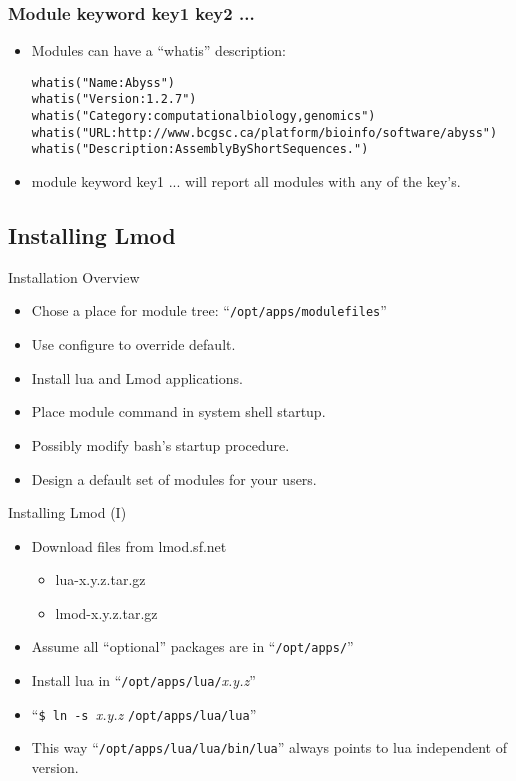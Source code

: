 \documentclass{beamer}
\begin{document}
\begin{frame}[fragile]
    \frametitle{Module keyword key1 key2 ...}
    \begin{itemize}
      \item
    Modules can have a ``whatis'' description:
    {\tiny
\begin{alltt}
whatis("Name: Abyss")
whatis("Version: 1.2.7")
whatis("Category: computational biology, genomics")
whatis("URL:http://www.bcgsc.ca/platform/bioinfo/software/abyss")
whatis("Description: Assembly By Short Sequences.")
\end{alltt}
    }
  \item {\color{blue}module keyword key1 ...} will report all modules
    with any of the {\color{blue}key}'s.
  \end{itemize}
\end{frame}

\subsection{Installing Lmod}
\label{sec:installing}

\begin{frame}{Installation Overview}
  \begin{itemize}
    \item Chose a place for module tree: ``\texttt{/opt/apps/modulefiles}''
    \item Use configure to override default.
    \item Install lua and Lmod applications.
    \item Place module command in system shell startup.
    \item Possibly modify bash's startup procedure.
    \item Design a default set of modules for your users.
  \end{itemize}
\end{frame}


\begin{frame}{Installing Lmod (I)}
  \begin{itemize}
    \item Download files from lmod.sf.net
      \begin{itemize}
        \item lua-x.y.z.tar.gz
        \item lmod-x.y.z.tar.gz
      \end{itemize}
    \item Assume all ``optional'' packages are in ``\texttt{/opt/apps/}''
    \item Install lua in ``\texttt{/opt/apps/lua/}\emph{x.y.z}''
    \item ``\texttt{\$ ln -s }\emph{x.y.z} \texttt{/opt/apps/lua/lua}''
    \item This way ``\texttt{/opt/apps/lua/lua/bin/lua}'' always points to
      lua independent of version.
  \end{itemize}
\end{frame}
\end{document}
